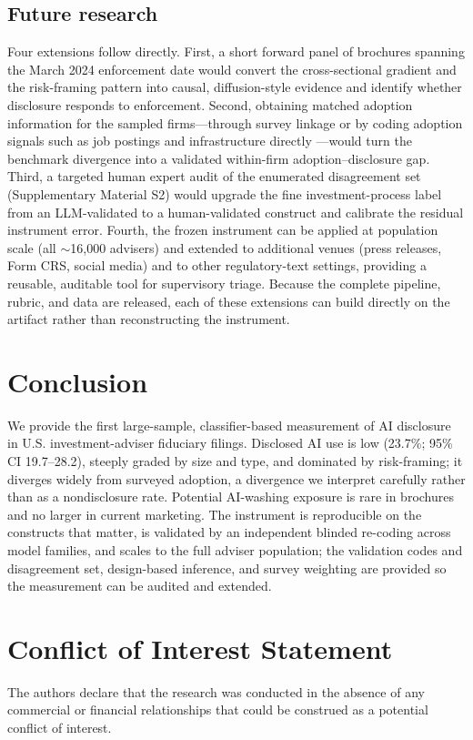 \documentclass[utf8]{FrontiersinHarvard} %
\begin{document}
\subsection{Future research}
Four extensions follow directly. First, a short forward panel of brochures spanning the March 2024 enforcement date would convert the cross-sectional gradient and the risk-framing pattern into causal, diffusion-style evidence and identify whether disclosure responds to enforcement. Second, obtaining matched adoption information for the sampled firms---through survey linkage or by coding adoption signals such as job postings and infrastructure directly \citep{babina2024}---would turn the benchmark divergence into a validated within-firm adoption--disclosure gap. Third, a targeted human expert audit of the enumerated disagreement set (Supplementary Material S2) would upgrade the fine investment-process label from an LLM-validated to a human-validated construct and calibrate the residual instrument error. Fourth, the frozen instrument can be applied at population scale (all $\sim$16{,}000 advisers) and extended to additional venues (press releases, Form CRS, social media) and to other regulatory-text settings, providing a reusable, auditable tool for supervisory triage. Because the complete pipeline, rubric, and data are released, each of these extensions can build directly on the artifact rather than reconstructing the instrument.

\section{Conclusion}
We provide the first large-sample, classifier-based measurement of AI disclosure in U.S. investment-adviser fiduciary filings. Disclosed AI use is low (23.7\%; 95\% CI 19.7--28.2), steeply graded by size and type, and dominated by risk-framing; it diverges widely from surveyed adoption, a divergence we interpret carefully rather than as a nondisclosure rate. Potential AI-washing exposure is rare in brochures and no larger in current marketing. The instrument is reproducible on the constructs that matter, is validated by an independent blinded re-coding across model families, and scales to the full adviser population; the validation codes and disagreement set, design-based inference, and survey weighting are provided so the measurement can be audited and extended.

\section*{Conflict of Interest Statement}
The authors declare that the research was conducted in the absence of any commercial or financial relationships that could be construed as a potential conflict of interest.
\end{document}
